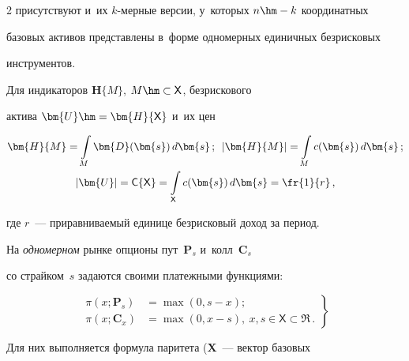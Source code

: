 \begin{multicols}{2}
присутствуют и~их $k$-мер\-ные версии, у~которых $n\hm- k$ координатных 


базовых активов пред\-став\-ле\-ны в~форме одномерных единичных без\-рис\-ко\-вых 


инструментов. 


  


  Для индикаторов $\bm{H}\{M\}$, $M\hm\subset {\mathsf X}$, без\-рис\-ко\-во\-го 


актива $\bm{U}\hm=\bm{H}\{ {\mathsf X}\}$ и~их цен 


  \begin{gather*}


  \bm{H}\{ M\}=\int\limits_M \bm{D}(\bm{s})\, d\bm{s}\,;\enskip


   \vert \bm{H}\{M\}\vert =\int\limits_M c(\bm{s})\,d\bm{s}\,;\\


   \vert \bm{U}\vert ={\mathsf C}\{ {\mathsf X}\}= \int\limits_{\mathsf X} c(\bm{s}) 


\,d\bm{s}=\fr{1}{r}\,,


   \end{gather*}


где $r$~--- приравниваемый единице безрисковый доход за период. 


  


  На \textit{одномерном} рынке опционы пут~$\bm{P}_s$ и~колл~$\bm{C}_s$ 


со страйком~$s$ задаются своими платежными функциями: 


  \begin{equation}


  \left.


  \begin{array}{rl}


  \pi(x;\bm{P}_s)&=\max (0,s-x);\\[6pt]


  \pi(x;{\bm C}_x)&=\max (0,x-s),\ x,s \in {\mathsf X}\subset \mathfrak{R}\,.


  \end{array}


  \right\}


  \label{e2-aga}


  \end{equation}




  Для них выполняется формула паритета ($\bm{X}$~--- вектор базовых 



\end{multicols}
